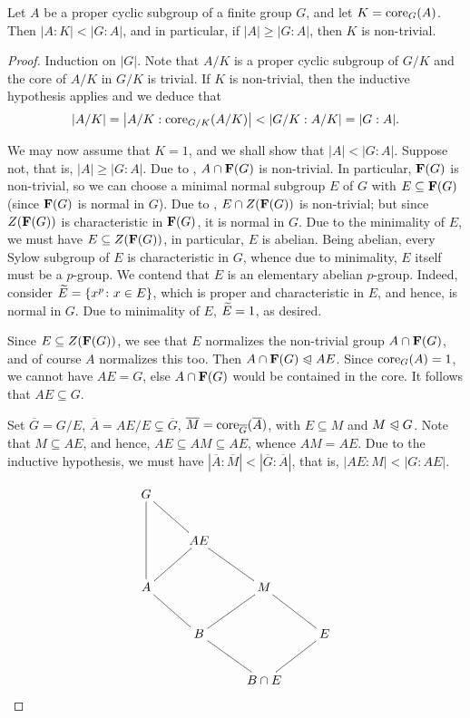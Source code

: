 \begin{theorem}[Luccini]
    Let $A$ be a proper cyclic subgroup of a finite group $G$, and let $K = \operatorname{core}_G(A)$. Then $|A : K| < |G : A|$, and in particular, if $|A|\ge |G : A|$, then $K$ is non-trivial.
\end{theorem}
\begin{proof}
    Induction on $|G|$. Note that $A/K$ is a proper cyclic subgroup of $G/K$ and the core of $A/K$ in $G/K$ is trivial. If $K$ is non-trivial, then the inductive hypothesis applies and we deduce that 
    \begin{equation*}
        |A/K| = \left|A/K : \operatorname{core}_{G/K}(A/K)\right| < |G/K : A/K| = |G : A|.
    \end{equation*}

    We may now assume  that $K = 1$, and we shall show that $|A| < |G : A|$. Suppose not, that is, $|A|\ge |G : A|$. Due to , $A\cap\mathbf{F}(G)$ is non-trivial. In particular, $\mathbf{F}(G)$ is non-trivial, so we can choose a minimal normal subgroup $E$ of $G$ with $E\subseteq\mathbf{F}(G)$ (since $\mathbf{F}(G)$ is normal in $G$). Due to , $E\cap Z(\mathbf{F}(G))$ is non-trivial; but since $Z(\mathbf{F}(G))$ is characteristic in $\mathbf{F}(G)$, it is normal in $G$. Due to the minimality of $E$, we must have $E\subseteq Z(\mathbf{F}(G))$, in particular, $E$ is abelian. Being abelian, every Sylow subgroup of $E$ is characteristic in $G$, whence due to minimality, $E$ itself must be a $p$-group. We contend that $E$ is an elementary abelian $p$-group. Indeed, consider $\widetilde{E} = \{x^p\colon x\in E\}$, which is proper and characteristic in $E$, and hence, is normal in $G$. Due to minimality of $E$, $\widetilde{E} = 1$, as desired.

    Since $E\subseteq Z(\mathbf{F}(G))$, we see that $E$ normalizes the non-trivial group $A\cap\mathbf{F}(G)$, and of course $A$ normalizes this too. Then $A\cap\mathbf{F}(G)\trianglelefteqslant AE$. Since $\operatorname{core}_G(A) = 1$, we cannot have $AE = G$, else $A\cap\mathbf{F}(G)$ would be contained in the core. It follows that $AE\subseteq G$.

    Set $\overline G = G/E$, $\overline A = AE/E\subsetneq\overline G$, $\overline{M} = \operatorname{core}_{\overline{G}}(\overline A)$, with $E\subseteq M$ and $M\trianglelefteqslant G$. Note that $M\subseteq AE$, and hence, $AE\subseteq AM\subseteq AE$, whence $AM = AE$. Due to the inductive hypothesis, we must have $|\overline A : \overline M| < |\overline G : \overline A|$, that is, $|AE : M| < |G : AE|$.

    \begin{equation*}
        \xymatrix {
            G\ar@{-}[dd]\ar@{-}[rd] & & & \\
            & AE\ar@{-}[rd]\ar@{-}[ld] & & \\
            A\ar@{-}[rd] & & M\ar@{-}[rd]\ar@{-}[ld] & \\
            & B\ar@{-}[rd] & & E\ar@{-}[ld] \\
            & & B\cap E & 
        }
    \end{equation*}


\end{proof}
